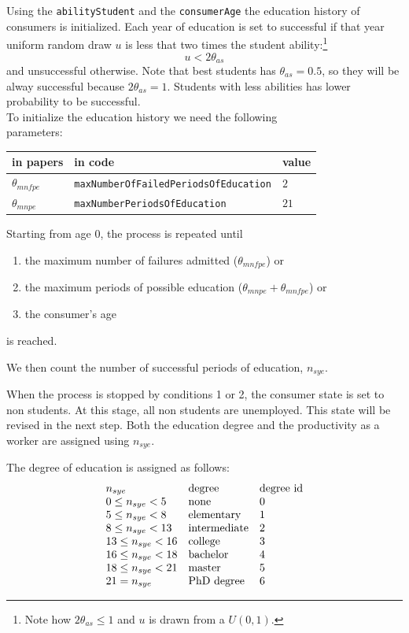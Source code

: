 \documentclass{book}
\begin{document}
\vskip5mm
Using the \verb+abilityStudent+ and the \verb+consumerAge+ the education history of consumers is initialized. Each year of education is set to successful if that year uniform random draw $u$ is less that two times the student ability:\footnote{Note how $2\theta_{as}\le 1$ and $u$ is drawn from a $U(0,1)$.}
\[
	u<2\theta_{as}
\]
and unsuccessful otherwise.  Note that best students has $\theta_{as}=0.5$, so they will be alway successful because $2\theta_{as}=1$. Students with less abilities has lower probability to be successful.\\

To initialize the education history we need the following\\ 
parameters:\\
\begin{tabular}{l l l}
	\hline
	in papers& in code&value\\
	\hline
	\hline
 $\theta_{mnfpe}$&\verb+maxNumberOfFailedPeriodsOfEducation+&$2$\\
 $\theta_{mnpe}$&\verb+maxNumberPeriodsOfEducation+&$21$\\
	\hline
\end{tabular}

\vskip5mm
Starting from age 0, the process is repeated until 
\begin{enumerate}
	\item the maximum number of failures admitted ($\theta_{mnfpe}$) or
	\item the maximum periods of possible education ($\theta_{mnpe}+\theta_{mnfpe}$) or
	\item the consumer's age 
\end{enumerate}
is reached.

We then count the number of successful periods of education, $n_{sye}$. 

When the process is stopped by conditions 1 or 2, the consumer state is set to non students. At this stage, all non students are unemployed. This state will be revised in the next step. Both the education degree and the productivity as a worker are assigned using $n_{sye}$. 

The degree of education is assigned as follows:
\[
	\begin{array}{l l l}
		n_{sye}& \textnormal{degree}& \textnormal{degree id}\\
	0\le n_{sye}<5 & \textnormal{none}&0\\
	5\le n_{sye}<8 & \textnormal{elementary}&1\\
	8\le n_{sye}<13 & \textnormal{intermediate}&2\\
	13\le n_{sye}<16 & \textnormal{college}&3\\
	16\le n_{sye}<18 & \textnormal{bachelor}&4\\
	18\le n_{sye}<21 & \textnormal{master}&5\\
	21= n_{sye} & \textnormal{PhD degree}&6
	\end{array}
\]
\end{document}
